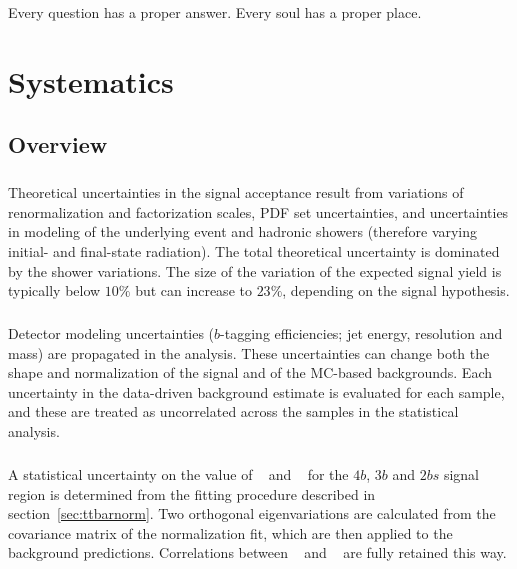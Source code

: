 \begin{savequote}[75mm]
Every question has a proper answer. Every soul has a proper place.
\end{savequote}

\chapter{Systematics}
\label{sec:systematics}


\section{Overview}

\paragraph{}
Theoretical uncertainties in the signal acceptance result from variations of renormalization and factorization scales, PDF set uncertainties, and uncertainties in modeling of the underlying event and hadronic showers (therefore varying initial- and final-state radiation).
The total theoretical uncertainty is dominated by the shower variations. 
The size of the variation of the expected signal yield is typically below $10\%$ but can increase to $23\%$, depending on the signal hypothesis.

\paragraph{}
Detector modeling uncertainties ($b$-tagging efficiencies; jet energy, resolution and mass) are propagated in the analysis. 
These uncertainties can change both the shape and normalization of the signal and of the MC-based backgrounds. 
Each uncertainty in the data-driven background estimate is evaluated for each sample, and these are treated as uncorrelated across the samples in the statistical analysis.

\paragraph{}
A statistical uncertainty on the value of \muqcd~ and \alphatt~ for the $4b$, $3b$ and $2bs$ signal region is determined from the fitting procedure described in section~\ref{sec:ttbarnorm}.
Two orthogonal eigenvariations are calculated from the covariance matrix of the normalization fit, which are then applied to the background predictions. 
Correlations between \alphatt~ and \muqcd~ are fully retained this way.

